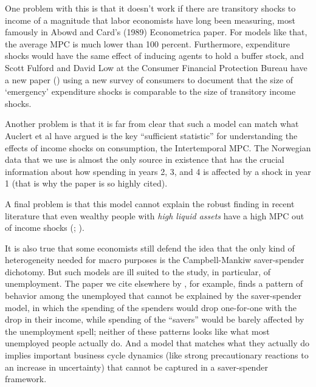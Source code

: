 \documentclass[12pt,letterpaper,english]{article}
\begin{document}
\begin{enumerate}
One problem with this is that it doesn't work if there are transitory shocks to income of a magnitude that labor economists have long been measuring, most famously in Abowd and Card's (1989) Econometrica paper.  For models like that, the average MPC is much lower than 100 percent.  Furthermore, expenditure shocks would have the same effect of inducing agents to hold a buffer stock, and Scott Fulford and David Low at the Consumer Financial Protection Bureau have a new paper (\cite{@flExpenseShocks}) using a new survey of consumers to document that the size of `emergency' expenditure shocks is comparable to the size of transitory income shocks.

Another problem is that it is far from clear that such a model can match what Auclert et al have argued is the key ``sufficient statistic'' for understanding the effects of income shocks on consumption, the Intertemporal MPC.  The Norwegian data that we use is almost the only source in existence that has the crucial information about how spending in years 2, 3, and 4 is affected by a shock in year 1 (that is why the paper is so highly cited).

A final problem is that this model cannot explain the robust finding in recent literature that even wealthy people with \textit{high liquid assets} have a high MPC out of income shocks (\cite{crawley2023MicroMacro}; \cite{graham2024mental}).

It is also true that some economists still defend the idea that the only kind of heterogeneity needed for macro purposes is the Campbell-Mankiw saver-spender dichotomy. But such models are ill suited to the study, in particular, of unemployment.  The paper we cite elsewhere by \citeauthor{ganongConsumer2019}, for example, finds a pattern of behavior among the unemployed that cannot be explained by the saver-spender model, in which the spending of the spenders would drop one-for-one with the drop in their income, while spending of the ``savers'' would be barely affected by the unemployment spell; neither of these patterns looks like what most unemployed people actually do.  And a model that matches what they actually do implies important business cycle dynamics (like strong precautionary reactions to an increase in uncertainty) that cannot be captured in a saver-spender framework.


\end{enumerate}
\end{document}
